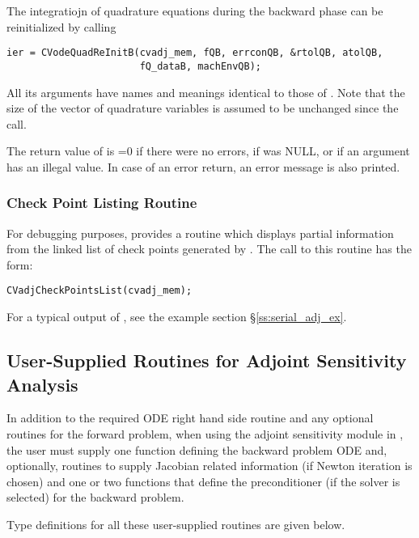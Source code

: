 The integratiojn of quadrature equations during the backward phase can be
reinitialized by calling
\begin{verbatim}
ier = CVodeQuadReInitB(cvadj_mem, fQB, errconQB, &rtolQB, atolQB, 
                       fQ_dataB, machEnvQB);
\end{verbatim}
All its arguments  have names and meanings identical to those of .
Note that the size of the vector of quadrature variables is assumed to 
be unchanged since the  call.

The return value  of  is  
=0 if there were no errors,
 if  was NULL, or
 if an argument has an illegal value.
In case of an error return, an error message is also printed.  

\subsubsection{Check Point Listing Routine}

For debugging purposes, {\cvodes} provides a routine  which
displays partial information from the linked list of check points generated by
. The call to this routine has the form:
\begin{verbatim}
CVadjCheckPointsList(cvadj_mem);
\end{verbatim}
For a typical output of , see the example section
\S\ref{ss:serial_adj_ex}.

\subsection{User-Supplied Routines for Adjoint Sensitivity Analysis}\label{ss:user_fct_adj}

In addition to the required ODE right hand side routine and any optional routines
for the forward problem, when using the adjoint sensitivity module in {\cvodes},
the user must supply one function defining the backward problem ODE and, optionally,
routines to supply Jacobian related information (if Newton iteration is chosen) and
one or two functions that define the preconditioner (if the {\cvspgmr} solver is
selected) for the backward problem.

Type definitions for all these user-supplied routines are given below.


